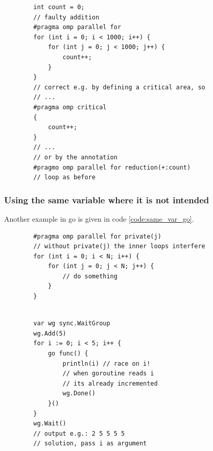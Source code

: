 \begin{codebox}[!htb]
    \begin{verbatim}
        int count = 0;
        // faulty addition
        #pragma omp parallel for
        for (int i = 0; i < 1000; i++) {
            for (int j = 0; j < 1000; j++) {
                count++;
            }
        }
        // correct e.g. by defining a critical area, so
        // ...
        #pragma omp critical
        {
            count++;
        }
        // ...
        // or by the annotation
        #pragmo omp parallel for reduction(+:count)
        // loop as before
    \end{verbatim}
    \caption{Parallel counter in C.}
    \label{code:parallel_counter_c}
\end{codebox}

\subsubsection{Using the same variable where it is not intended}
Another example in go is given in code \ref{code:same_var_go}.

\begin{codebox}[!htb]
    \begin{verbatim}
        #pragma omp parallel for private(j)
        // without private(j) the inner loops interfere
        for (int i = 0; i < N; i++) {
            for (int j = 0; j < N; j++) {
                // do something
            }
        }
        
    \end{verbatim}
    \caption{Problem with using the same variable where it is not intended.}
    \label{code:double_loop}
\end{codebox}

\begin{codebox}[!htb]
    \begin{verbatim}
        var wg sync.WaitGroup
        wg.Add(5)
        for i := 0; i < 5; i++ {
            go func() {
                println(i) // race on i!
                // when goroutine reads i
                // its already incremented
                wg.Done()
            }()
        }
        wg.Wait()
        // output e.g.: 2 5 5 5 5
        // solution, pass i as argument
    \end{verbatim}
    \caption{Races can be devious.}
    \label{code:same_var_go}
\end{codebox}

